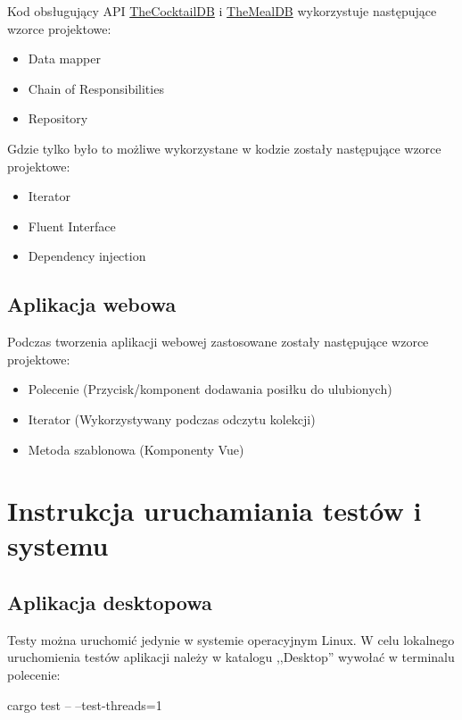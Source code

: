 \documentclass[12pt,a4paper]{article}
\begin{document}
			\indent Kod obsługujący API \href{https://www.thecocktaildb.com/api.php}{TheCocktailDB} i \href{https://www.themealdb.com/api.php}{TheMealDB}
			wykorzystuje następujące wzorce projektowe:
			\begin{itemize}
				\item Data mapper
				\item Chain of Responsibilities
				\item Repository
			\end{itemize}

			\indent Gdzie tylko było to możliwe wykorzystane w kodzie zostały następujące wzorce projektowe:
			\begin{itemize}
			\item Iterator
			\item Fluent Interface
			\item Dependency injection
			\end{itemize}			 

		\subsection{Aplikacja webowa}	
		Podczas tworzenia aplikacji webowej zastosowane zostały następujące wzorce projektowe:
		\begin{itemize}
			\item Polecenie (Przycisk/komponent dodawania posiłku do ulubionych)
			\item Iterator (Wykorzystywany podczas odczytu kolekcji)
			\item Metoda szablonowa (Komponenty Vue)
			\end{itemize} 
	\newpage
	
	\section{Instrukcja uruchamiania testów i systemu}
		\subsection{Aplikacja desktopowa}

			\indent Testy można uruchomić jedynie w systemie operacyjnym Linux. W celu lokalnego uruchomienia testów aplikacji należy w katalogu ,,Desktop''
			wywołać w terminalu polecenie:
			\begin{tcolorbox}[minipage,colback=white,arc=0pt,outer arc=0pt, fontupper=\normalsize]
				\center					
					cargo test -- --test-threads=1
			\end{tcolorbox}
\end{document}
